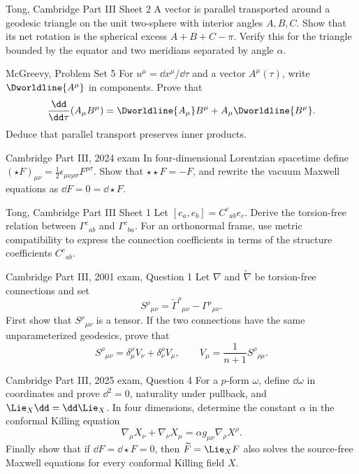 \begin{exercises}
\begin{exercise}{Tong, Cambridge Part III Sheet 2}
A vector is parallel transported around a geodesic triangle on the unit
two-sphere with interior angles \(A,B,C\).  Show that its net rotation is the
spherical excess \(A+B+C-\pi\).  Verify this for the triangle bounded by the
equator and two meridians separated by angle \(\alpha\).
\end{exercise}

\begin{exercise}{McGreevy, Problem Set 5}
For \(u^\mu=\dd x^\mu/\dd\tau\) and a vector \(A^\mu(\tau)\), write
\(\Dworldline{A^\mu}\) in components.  Prove that
\[
\frac{\dd}{\dd\tau}(A_\mu B^\mu)
=\Dworldline{A_\mu}B^\mu+A_\mu\Dworldline{B^\mu}.
\]
Deduce that parallel transport preserves inner products.
\end{exercise}

\begin{exercise}{Cambridge Part III, 2024 exam}
In four-dimensional Lorentzian spacetime define
\((\star F)_{\mu\nu}=\tfrac12\epsilon_{\mu\nu\rho\sigma}F^{\rho\sigma}\).
Show that \(\star\star F=-F\), and rewrite the vacuum Maxwell equations as
\(\dd F=0=\dd\star F\).
\end{exercise}

\begin{exercise}{Tong, Cambridge Part III Sheet 1}
Let \([e_a,e_b]=C^c{}_{ab}e_c\).  Derive the torsion-free relation between
\(\Gamma^c{}_{ab}\) and \(\Gamma^c{}_{ba}\).  For an orthonormal frame, use
metric compatibility to express the connection coefficients in terms of the
structure coefficients \(C^c{}_{ab}\).
\end{exercise}

\begin{exercise}{Cambridge Part III, 2001 exam, Question 1}
Let \(\nabla\) and \(\widetilde\nabla\) be torsion-free connections and set
\[
S^\rho{}_{\mu\nu}
=\widetilde\Gamma^\rho{}_{\mu\nu}-\Gamma^\rho{}_{\mu\nu}.
\]
First show that \(S^\rho{}_{\mu\nu}\) is a tensor.  If the two connections
have the same unparameterized geodesics, prove that
\[
S^\rho{}_{\mu\nu}
=\delta^\rho_\mu V_\nu+\delta^\rho_\nu V_\mu,
\qquad
V_\mu=\frac{1}{n+1}S^\rho{}_{\rho\mu}.
\]
\end{exercise}

\begin{exercise}{Cambridge Part III, 2025 exam, Question 4}
For a \(p\)-form \(\omega\), define \(\dd\omega\) in coordinates and prove
\(\dd^2=0\), naturality under pullback, and
\(\Lie_X\dd=\dd\Lie_X\).  In four dimensions, determine the constant
\(\alpha\) in the conformal Killing equation
\[
\nabla_\mu X_\nu+\nabla_\nu X_\mu
=\alpha g_{\mu\nu}\nabla_\rho X^\rho.
\]
Finally show that if \(\dd F=\dd\star F=0\), then
\(\widetilde F=\Lie_XF\) also solves the source-free Maxwell equations for
every conformal Killing field \(X\).
\end{exercise}


\end{exercises}
